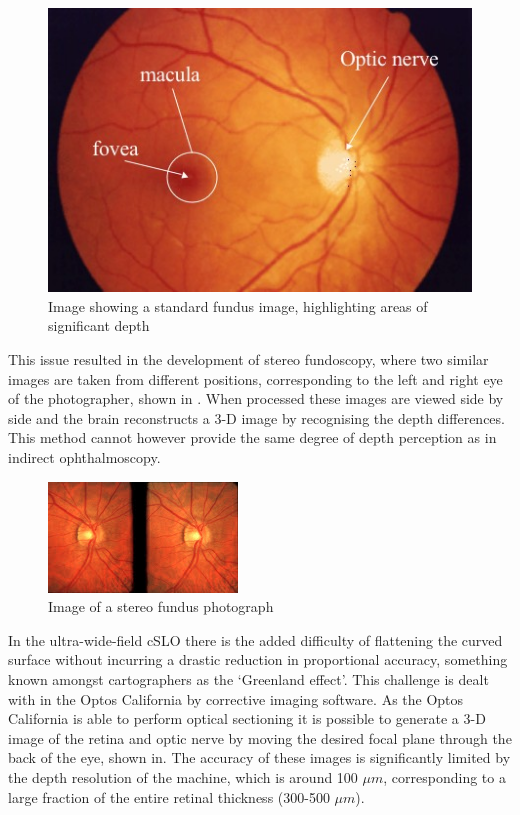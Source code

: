 \begin{figure}[htbp]
\centering
\includegraphics{figures/normalfundus}
\caption{Image showing a  standard fundus image, highlighting areas of significant depth}
\label{fig:standard}
   \end{figure}

This issue resulted in the development of stereo fundoscopy, where
two similar images are taken from different positions, corresponding
to the left and right eye of the photographer, shown in .
When processed these images are viewed side by side and the brain
reconstructs a 3-D image by recognising the depth differences.\cite{tyler1997stereo}
This method cannot however provide the same degree of depth perception
as in indirect ophthalmoscopy.

\begin{figure}[htbp]
\centering
\includegraphics{figures/stereo}
\caption{Image of a stereo fundus photograph}
\label{fig:stereo}
   \end{figure}


In the ultra-wide-field cSLO there is the added difficulty of flattening
the curved surface without incurring a drastic reduction in proportional
accuracy, something known amongst cartographers as the ‘Greenland effect’.
This challenge is dealt with in the Optos California by corrective imaging
software. As the Optos California is able to perform optical sectioning it
is possible to generate a 3-D image of the retina and optic nerve by moving
the desired focal plane through the back of the eye, shown in.
The accuracy of these images is significantly limited by the depth resolution
of the machine, which is around 100 $\mu m$, corresponding to  a large
fraction of the entire retinal thickness (300-500 $\mu m$).


